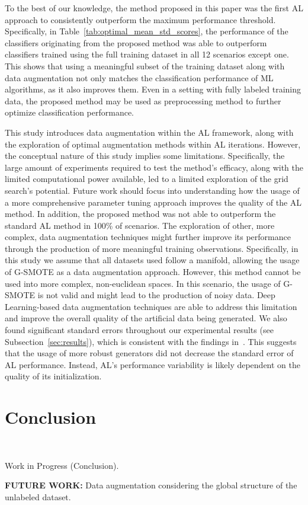 \documentclass[parskip=full]{scrartcl}
\begin{document}
To the best of our knowledge, the method proposed in this paper was the first
AL approach to consistently outperform the maximum performance threshold.
Specifically, in Table~\ref{tab:optimal_mean_std_scores}, the performance of
the classifiers originating from the proposed method was able to outperform
classifiers trained using the full training dataset in all 12 scenarios except
one. This shows that using a meaningful subset of the training dataset along
with data augmentation not only matches the classification performance of ML
algorithms, as it also improves them. Even in a setting with fully labeled
training data, the proposed method may be used as preprocessing method to
further optimize classification performance.

This study introduces data augmentation within the AL framework, along with
the exploration of optimal augmentation methods within AL iterations. However,
the conceptual nature of this study implies some limitations. Specifically,
the large amount of experiments required to test the method's efficacy, along
with the limited computational power available, led to a limited exploration
of the grid search's potential. Future work should focus into understanding
how the usage of a more comprehensive parameter tuning approach improves the
quality of the AL method. In addition, the proposed method was not able to
outperform the standard AL method in 100\% of scenarios. The exploration of
other, more complex, data augmentation techniques might further improve its
performance through the production of more meaningful training observations.
Specifically, in this study we assume that all datasets used follow a
manifold, allowing the usage of G-SMOTE as a data augmentation approach.
However, this method cannot be used into more complex, non-euclidean spaces.
In this scenario, the usage of G-SMOTE is not valid and might lead to the
production of noisy data. Deep Learning-based data augmentation techniques are
able to address this limitation and improve the overall quality of the
artificial data being generated. We also found significant standard errors
throughout our experimental results (see Subsection~\ref{sec:results}), which
is consistent with the findings in~\cite{Fonseca2021, Kottke2017}. This
suggests that the usage of more robust generators did not decrease the
standard error of AL performance. Instead, AL's performance variability is
likely dependent on the quality of its initialization.

\section{Conclusion}~\label{sec:conclusion}

Work in Progress (Conclusion).

\textbf{FUTURE WORK:} Data augmentation considering the global structure of
the unlabeled dataset.



\end{document}
